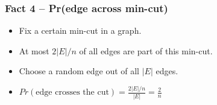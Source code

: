\begin{frame}
  \frametitle{Fact 4 -- Pr(edge across min-cut)}
   
  \begin{itemize}
    \item Fix a certain min-cut in a graph.
    \item At most $2|E|/n$ of all edges are part of this min-cut.
    \item Choose a random edge out of all $|E|$ edges.
    \item $Pr(\text{edge crosses the cut}) = \frac{2|E|/n}{|E|} = \frac{2}{n}$
  \end{itemize}
   
\end{frame}
